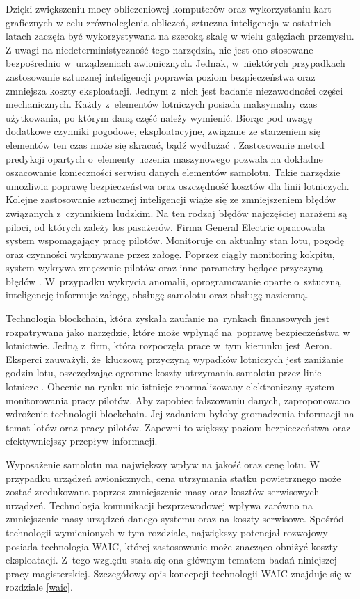 \documentclass[a4paper, 12pt, twoside]{article}
\begin{document}
Dzięki zwiększeniu mocy obliczeniowej komputerów oraz wykorzystaniu kart graficznych w celu zrównoleglenia obliczeń, sztuczna inteligencja w ostatnich latach zaczęła być wykorzystywana na szeroką skalę w wielu gałęziach przemysłu. Z uwagi na niedeterministyczność tego narzędzia, nie jest ono stosowane bezpośrednio w~urządzeniach awionicznych. Jednak, w~niektórych przypadkach zastosowanie sztucznej inteligencji poprawia poziom bezpieczeństwa oraz zmniejsza koszty eksploatacji. Jednym z~nich jest badanie niezawodności części mechanicznych. Każdy z~elementów lotniczych posiada maksymalny czas użytkowania, po którym daną część należy wymienić. Biorąc pod uwagę dodatkowe czynniki pogodowe, eksploatacyjne, związane ze starzeniem się elementów ten czas może się skracać, bądź wydłużać \cite{mlMechanical}. Zastosowanie metod predykcji opartych o~elementy uczenia maszynowego pozwala na dokładne oszacowanie konieczności serwisu danych elementów samolotu. Takie narzędzie umożliwia poprawę bezpieczeństwa oraz oszczędność kosztów dla linii lotniczych. Kolejne zastosowanie sztucznej inteligencji wiąże się ze zmniejszeniem błędów związanych z~czynnikiem ludzkim. Na ten rodzaj błędów najczęściej narażeni są piloci, od których zależy los pasażerów.  Firma General Electric opracowała system wspomagający pracę pilotów. Monitoruje on aktualny stan lotu, pogodę oraz czynności wykonywane przez załogę. Poprzez ciągły monitoring kokpitu, system wykrywa zmęczenie pilotów oraz inne parametry będące przyczyną błędów \cite{mlPilots}. W~przypadku wykrycia anomalii, oprogramowanie oparte o~sztuczną inteligencję informuje załogę, obsługę samolotu oraz obsługę naziemną.

Technologia blockchain, która zyskała zaufanie na~rynkach finansowych jest rozpatrywana jako narzędzie, które może wpłynąć na~poprawę bezpieczeństwa w lotnictwie. Jedną z~firm, która rozpoczęła prace w~tym kierunku jest Aeron. Eksperci zauważyli, że~kluczową przyczyną wypadków lotniczych jest zaniżanie godzin lotu, oszczędzając ogromne koszty utrzymania samolotu przez linie lotnicze \cite{aeron}. Obecnie na rynku nie istnieje znormalizowany elektroniczny system monitorowania pracy pilotów. Aby zapobiec fałszowaniu danych, zaproponowano wdrożenie technologii blockchain. Jej zadaniem byłoby gromadzenia informacji na temat lotów oraz pracy pilotów. Zapewni to większy poziom bezpieczeństwa oraz efektywniejszy przepływ informacji.

Wyposażenie samolotu ma największy wpływ na jakość oraz cenę lotu. W przypadku urządzeń awionicznych, cena utrzymania statku powietrznego może zostać zredukowana poprzez zmniejszenie masy oraz kosztów serwisowych urządzeń. Technologia komunikacji bezprzewodowej wpływa zarówno na zmniejszenie masy urządzeń danego systemu oraz na koszty serwisowe. Spośród technologii wymienionych w tym rozdziale, największy potencjał rozwojowy posiada technologia WAIC, której zastosowanie może znacząco obniżyć koszty eksploatacji. Z~tego względu stała się ona głównym tematem badań niniejszej pracy magisterskiej. Szczegółowy opis koncepcji technologii WAIC znajduje się w rozdziale \ref{waic}.
\end{document}
